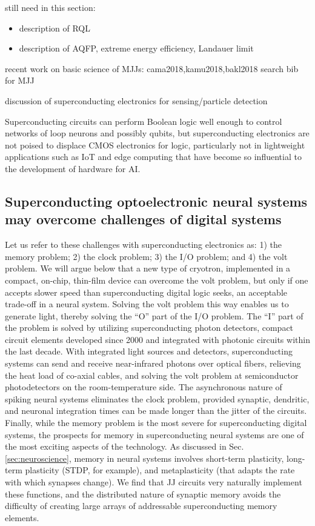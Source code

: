 \documentclass[twocolumn]{article}
\begin{document}
\vspace{3em}
still need in this section:
\begin{itemize}
\item description of RQL
\item description of AQFP, extreme energy efficiency, Landauer limit
\end{itemize}

\vspace{3em}
recent work on basic science of MJJs: cama2018,kamu2018,bakl2018
search bib for MJJ

\vspace{3em} 
discussion of superconducting electronics for sensing/particle detection

\vspace{3em}
Superconducting circuits can perform Boolean logic well enough to control networks of loop neurons and possibly qubits, but superconducting electronics are not poised to displace CMOS electronics for logic, particularly not in lightweight applications such as IoT and edge computing that have become so influential to the development of hardware for AI. 

\subsection{Superconducting optoelectronic neural systems may overcome challenges of digital systems}
Let us refer to these challenges with superconducting electronics as: 1) the memory problem; 2) the clock problem; 3) the I/O problem; and 4) the volt problem. We will argue below that a new type of cryotron, implemented in a compact, on-chip, thin-film device can overcome the volt problem, but only if one accepts slower speed than superconducting digital logic seeks, an acceptable trade-off in a neural system. Solving the volt problem this way enables us to generate light, thereby solving the ``O'' part of the I/O problem. The ``I'' part of the problem is solved by utilizing superconducting photon detectors, compact circuit elements developed since 2000 and integrated with photonic circuits within the last decade. With integrated light sources and detectors, superconducting systems can send and receive near-infrared photons over optical fibers, relieving the heat load of co-axial cables, and solving the volt problem at semiconductor photodetectors on the room-temperature side. The asynchronous nature of spiking neural systems eliminates the clock problem, provided synaptic, dendritic, and neuronal integration times can be made longer than the jitter of the circuits. Finally, while the memory problem is the most severe for superconducting digital systems, the prospects for memory in superconducting neural systems are one of the most exciting aspects of the technology. As discussed in Sec.\,\ref{sec:neuroscience}, memory in neural systems involves short-term plasticity, long-term plasticity (STDP, for example), and metaplasticity (that adapts the rate with which synapses change). We find that JJ circuits very naturally implement these functions, and the distributed nature of synaptic memory avoids the difficulty of creating large arrays of addressable superconducting memory elements. 
\end{document}
